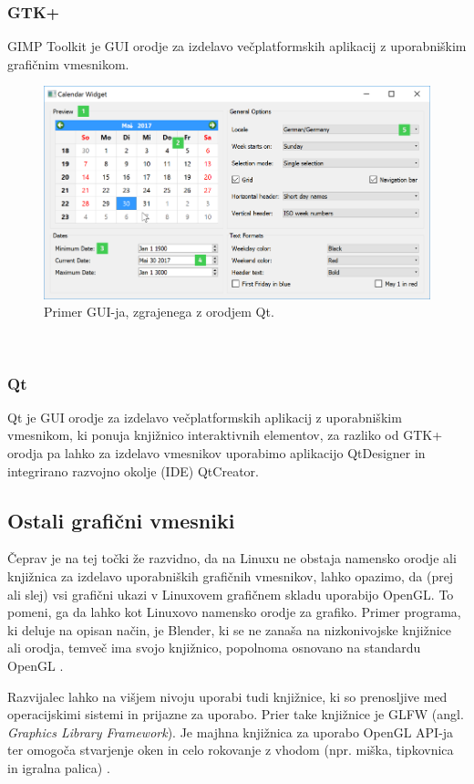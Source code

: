 \documentclass{article}
\begin{document}
\subsubsection{GTK+}
GIMP Toolkit je GUI orodje za izdelavo večplatformskih aplikacij z uporabniškim grafičnim vmesnikom.

\vspace*{8em}

\begin{figure}
    \vspace*{10pt}
    \centering
    \includegraphics[width=0.8\linewidth]{windows-style2}
    \caption{Primer GUI-ja, zgrajenega z orodjem Qt. \autocite{fig:calendar}}
\end{figure}
\
\subsubsection{Qt}
Qt je GUI orodje za izdelavo večplatformskih aplikacij z uporabniškim vmesnikom, ki ponuja knjižnico interaktivnih elementov, za razliko od GTK+ orodja pa lahko za izdelavo vmesnikov uporabimo aplikacijo QtDesigner in integrirano razvojno okolje (IDE) QtCreator.

\subsection{Ostali grafični vmesniki}
Čeprav je na tej točki že razvidno, da na Linuxu ne obstaja namensko orodje ali knjižnica za izdelavo uporabniških grafičnih vmesnikov, lahko opazimo, da (prej ali slej) vsi grafični ukazi v Linuxovem grafičnem skladu uporabijo OpenGL. To pomeni, ga da lahko kot Linuxovo namensko orodje za grafiko. Primer programa, ki deluje na opisan način, je Blender, ki se ne zanaša na nizkonivojske knjižnice ali orodja, temveč ima svojo knjižnico, popolnoma osnovano na standardu OpenGL \autocite{blendergui}.

Razvijalec lahko na višjem nivoju uporabi tudi knjižnice, ki so prenosljive med operacijskimi sistemi in prijazne za uporabo. Prier take knjižnice je GLFW (angl. \textit{Graphics Library Framework}). Je majhna knjižnica za uporabo OpenGL API-ja ter omogoča stvarjenje oken in celo rokovanje z vhodom (npr. miška, tipkovnica in igralna palica) \autocite{glfwwiki, glfw}.
\end{document}
